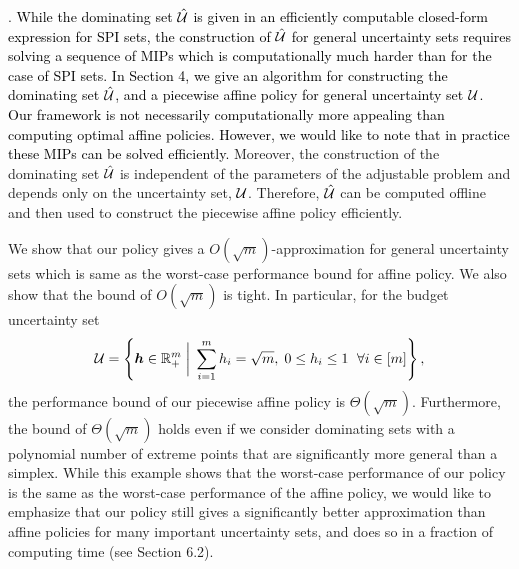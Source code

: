 \documentclass[11pt]{article}
\theoremstyle{plain}
\theoremstyle{definition}
\numberwithin{equation}{section}%
\numberwithin{equation}{section}%
\newcommand{\mb}[1]{\ensuremath{\boldsymbol{#1}}}
\newcommand*{\red}{\textcolor{black}}
\begin{document}

\vspace{2mm}
. 
\red{While the dominating set $\hat{\cal U}$ is given in an efficiently computable closed-form expression for SPI sets, the construction of
$\hat{\cal U}$  for general uncertainty sets requires solving a sequence of MIPs   which is computationally much harder than for the case of SPI sets.
In Section 4, we give an algorithm for constructing the dominating set $\hat{\cal U}$, and a piecewise affine policy for general uncertainty set ${\cal U}$. Our framework is not necessarily computationally more appealing than computing optimal affine policies. However, we would like to note that in practice these MIPs can be solved efficiently.} Moreover, the construction of the dominating set $\hat{\cal U}$ is independent
of the parameters of the adjustable problem and depends only on the uncertainty set, ${\cal U}$. Therefore, $\hat{\cal U}$ can be computed offline and then used to construct the piecewise affine policy efficiently.

We show that our policy gives a $O(\sqrt m)$-approximation for general uncertainty sets which is same as the worst-case performance bound for affine policy. We also show that the bound of $O(\sqrt m)$ is tight. In particular, for the budget uncertainty set
\[{\cal U}= \left\{ \mb h \in \mathbb R^{m}_+ \;  \bigg\vert \;     \sum_{i=1}^m h_i = \sqrt{m} , \; 0 \leq h_i \leq 1 \ \;  \forall i \in [m]       \right\},\]
the performance bound of our piecewise affine policy is $\Theta(\sqrt m)$. Furthermore, the bound of $\Theta(\sqrt m)$ holds even if we consider dominating sets with a polynomial number of extreme points that are significantly more general than a simplex.  While this example shows that the worst-case performance of our policy is the same as the worst-case performance of the affine policy, we would like to emphasize that our policy still gives a significantly better approximation than affine policies for many important uncertainty sets, and does so in a fraction of computing time (see Section 6.2).
\end{document}
